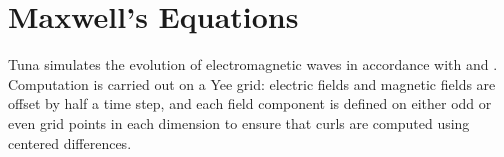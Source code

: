 




\section{Maxwell's Equations}
  \label{sec_eqns}


Tuna simulates the evolution of electromagnetic waves in accordance with
\amplaw and \farlaw. Computation is carried out on a Yee grid\cite{yee_1966}:
electric fields and magnetic fields are offset by half a time step, and each
field component is defined on either odd or even grid points in each dimension
to ensure that curls are computed using centered differences. 





